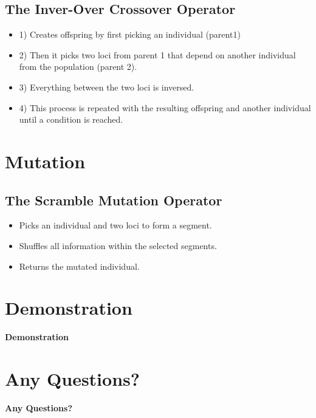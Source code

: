 \documentclass[xcolor={usenames,dvipsnames,svgnames}]{beamer}
\begin{document}
\subsection{The Inver-Over Crossover Operator}
\begin{frame}
\begin{itemize}
	\item<1-> 1) Creates offspring by first picking an individual (parent1) 
	\item<2-> 2) Then it picks two loci from parent 1 that depend on another individual from the population (parent 2). 
	\item<3-> 3) Everything between the two loci is inversed. 
	\item<4-> 4) This process is repeated with the resulting offspring and another individual until a condition is reached.	
\end{itemize}
\end{frame}

\section{Mutation}
\subsection{The Scramble Mutation Operator}
\begin{frame}
\begin{itemize}
	\item<1-> Picks an individual and two loci to form a segment.
	\item<2-> Shuffles all information within the selected segments.
	\item<3-> Returns the mutated individual.
\end{itemize}
\end{frame}

\nohead
\section{Demonstration}
\begin{frame}

{\Huge\bfseries Demonstration}
\end{frame}

\nohead
\section{Any Questions?}
\begin{frame}

{\Huge\bfseries Any Questions?}
\end{frame}

\end{document}
